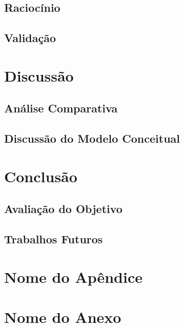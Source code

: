 \documentclass[openright]{normas-utf-tex} %
\begin{document}
	\section{Raciocínio} \label{rac}
			
	\section{Validação} \label{validation}
		
\chapter{Discussão}
	
	\section{Análise Comparativa}\label{analisecomparativa}
		
			
		
		
		
				
		
		
	\section{Discussão do Modelo Conceitual}\label{constresult}
		
\label{chap:anacomp}
\chapter{Conclusão}
\label{chpa:conc}
	
	\section{Avaliação do Objetivo}
		
	\section{Trabalhos Futuros}
		

\clearpage %
\label{bibstart}
\label{bibend}

\apendice
\chapter{Nome do Ap\^endice}

\anexo
\chapter{Nome do Anexo}
\end{document}
